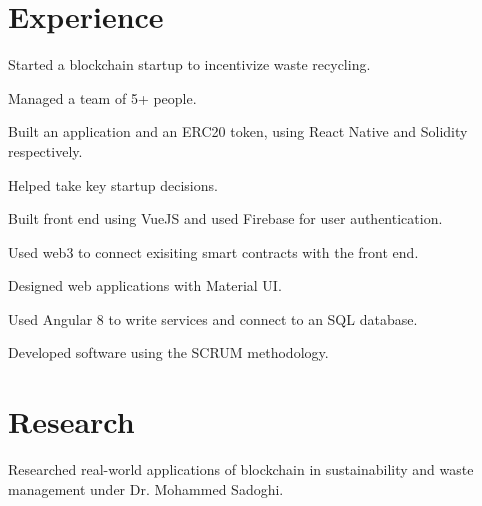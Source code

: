 \documentclass[]{resume-openfont}
\begin{document}
\hfill
\begin{minipage}[t]{0.66\textwidth} 


\section{Experience}
\vspace{\topsep} %
\begin{tightemize}
\item Started a blockchain startup to incentivize waste recycling.
\item Managed a team of 5+ people.
\item Built an application and an ERC20 token, using React Native and Solidity respectively.
\end{tightemize}
\sectionsep

\begin{tightemize}
\item Helped take key startup decisions.
\item Built front end using VueJS and used Firebase for user authentication. 
\item Used web3 to connect exisiting smart contracts with the front end.
\end{tightemize}
\sectionsep

\begin{tightemize}
\item Designed web applications with Material UI.
\item Used Angular 8 to write services and connect to an SQL database.
\item Developed software using the SCRUM methodology.
\end{tightemize}
\sectionsep



\section{Research}
Researched real-world applications of blockchain in sustainability and waste management under Dr. Mohammed Sadoghi.
\sectionsep


\end{minipage}
\end{document}
